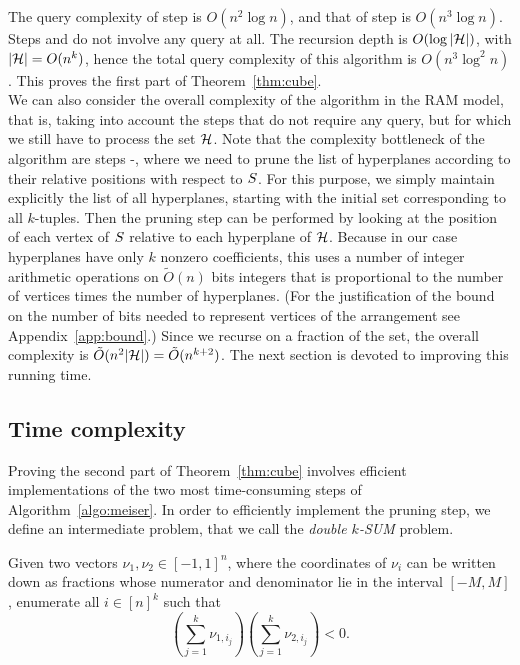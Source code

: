 The query complexity of step  is $O(n^2 \log n)$, and that of step
 is $O(n^3 \log n)$. Steps  and  do not involve any
query at all. The recursion depth is $O(\log |{\mathcal{H}}|)$, with $|\mathcal{H}|=O(n^k)$,
hence the total query complexity of this algorithm is $O(n^3 \log^2 n)$. This
proves the first part of Theorem~\ref{thm:cube}.\\

We can also consider the overall complexity of the algorithm in the RAM model,
that is, taking into account the steps that do not require any query, but for
which we still have to process the set $\mathcal{H}$. Note that the complexity
bottleneck of the algorithm are steps -, where we need to prune
the list of hyperplanes according to their relative positions with respect to
$S$. For this purpose, we simply maintain explicitly the list of all
hyperplanes, starting with the initial set corresponding to all $k$-tuples.
Then the pruning step can be performed by looking at the position of each
vertex of $S$ relative to each hyperplane of $\mathcal{H}$.
Because in our case hyperplanes have only $k$ nonzero coefficients, this uses a
number of integer arithmetic operations on $\tilde{O}(n)$ bits integers that is
proportional to the number of vertices times the number of hyperplanes.
(For the justification of the bound on the number of bits needed to represent
vertices of the arrangement see Appendix~\ref{app:bound}.)
Since we recurse on a fraction of the set, the overall complexity is
$\tilde{O}(n^2|{\mathcal{H}}|) = \tilde{O}(n^{k+2})$. The next section is devoted
to improving this running time.


\subsection{Time complexity}
\label{sec:time-complexity}

Proving the second part of Theorem~\ref{thm:cube} involves efficient implementations of
the two most time-consuming steps of Algorithm~\ref{algo:meiser}.
In order to efficiently implement the pruning
step, we define an intermediate problem, that we call the \emph{double $k$-SUM}
problem.
\begin{problem}
	Given two vectors $\nu_1, \nu_2 \in {[-1,1]}^n$, where the coordinates of
	$\nu_i$ can be written down as fractions whose numerator and denominator
	lie in the interval $[-M,M]$, enumerate all
	$i\in {[n]}^k$ such that
	$$
	\left(\sum_{j=1}^{k} \nu_{1,i_j}\right)
	\left(\sum_{j=1}^{k} \nu_{2,i_j}\right)
	< 0.
	$$
\end{problem}

